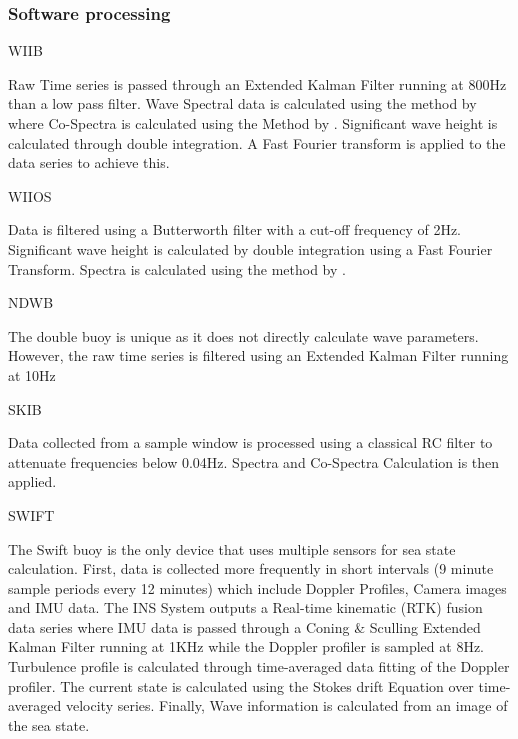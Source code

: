 \subsubsection{Software processing}

\par{WIIB}	

Raw Time series is passed through an Extended Kalman Filter running at 800Hz than a low pass filter. Wave Spectral data is calculated using the method by \textcite{earle1996nondirectional} where Co-Spectra is calculated using the Method by \textcite{kuik1988method}. Significant wave height is calculated through double integration. A Fast Fourier transform is applied to the data series to achieve this.
\par{WIIOS}

Data is filtered using a Butterworth filter with a cut-off frequency of 2Hz. Significant wave height is calculated by double integration using a Fast Fourier Transform. Spectra is calculated using the method by \textcite{earle1996nondirectional}.

\par{NDWB}

The double buoy is unique as it does not directly calculate wave parameters. However, the raw time series is filtered using an Extended Kalman Filter running at 10Hz

\par{SKIB}

Data collected from a sample window is processed using a classical RC filter to attenuate frequencies below 0.04Hz. \textcite{earle1996nondirectional} Spectra and Co-Spectra  Calculation is then applied.

\par{SWIFT}

The Swift buoy is the only device that uses multiple sensors for sea state calculation. First, data is collected more frequently in short intervals (9 minute sample periods every 12 minutes) which include Doppler Profiles, Camera images and IMU data. The INS System outputs a Real-time kinematic (RTK) fusion data series where IMU data is passed through a Coning \& Sculling Extended Kalman Filter running at 1KHz while the Doppler profiler is sampled at 8Hz. Turbulence profile is calculated through time-averaged data fitting of the Doppler profiler. The current state is calculated using the Stokes drift Equation over time-averaged velocity series. Finally, Wave information is calculated from an image of the sea state.

